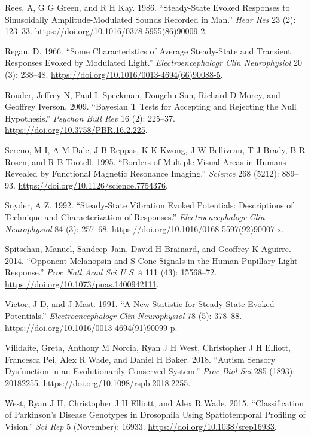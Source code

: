 \documentclass[]{article}
\begin{document}
\leavevmode\hypertarget{ref-Rees1986}{}%
Rees, A, G G Green, and R H Kay. 1986. ``Steady-State Evoked Responses to Sinusoidally Amplitude-Modulated Sounds Recorded in Man.'' \emph{Hear Res} 23 (2): 123--33. \url{https://doi.org/10.1016/0378-5955(86)90009-2}.

\leavevmode\hypertarget{ref-Regan1966}{}%
Regan, D. 1966. ``Some Characteristics of Average Steady-State and Transient Responses Evoked by Modulated Light.'' \emph{Electroencephalogr Clin Neurophysiol} 20 (3): 238--48. \url{https://doi.org/10.1016/0013-4694(66)90088-5}.

\leavevmode\hypertarget{ref-Rouder2009}{}%
Rouder, Jeffrey N, Paul L Speckman, Dongchu Sun, Richard D Morey, and Geoffrey Iverson. 2009. ``Bayesian T Tests for Accepting and Rejecting the Null Hypothesis.'' \emph{Psychon Bull Rev} 16 (2): 225--37. \url{https://doi.org/10.3758/PBR.16.2.225}.

\leavevmode\hypertarget{ref-Sereno1995}{}%
Sereno, M I, A M Dale, J B Reppas, K K Kwong, J W Belliveau, T J Brady, B R Rosen, and R B Tootell. 1995. ``Borders of Multiple Visual Areas in Humans Revealed by Functional Magnetic Resonance Imaging.'' \emph{Science} 268 (5212): 889--93. \url{https://doi.org/10.1126/science.7754376}.

\leavevmode\hypertarget{ref-Snyder1992}{}%
Snyder, A Z. 1992. ``Steady-State Vibration Evoked Potentials: Descriptions of Technique and Characterization of Responses.'' \emph{Electroencephalogr Clin Neurophysiol} 84 (3): 257--68. \url{https://doi.org/10.1016/0168-5597(92)90007-x}.

\leavevmode\hypertarget{ref-Spitschan2014}{}%
Spitschan, Manuel, Sandeep Jain, David H Brainard, and Geoffrey K Aguirre. 2014. ``Opponent Melanopsin and S-Cone Signals in the Human Pupillary Light Response.'' \emph{Proc Natl Acad Sci U S A} 111 (43): 15568--72. \url{https://doi.org/10.1073/pnas.1400942111}.

\leavevmode\hypertarget{ref-Victor1991}{}%
Victor, J D, and J Mast. 1991. ``A New Statistic for Steady-State Evoked Potentials.'' \emph{Electroencephalogr Clin Neurophysiol} 78 (5): 378--88. \url{https://doi.org/10.1016/0013-4694(91)90099-p}.

\leavevmode\hypertarget{ref-Vilidaite2018}{}%
Vilidaite, Greta, Anthony M Norcia, Ryan J H West, Christopher J H Elliott, Francesca Pei, Alex R Wade, and Daniel H Baker. 2018. ``Autism Sensory Dysfunction in an Evolutionarily Conserved System.'' \emph{Proc Biol Sci} 285 (1893): 20182255. \url{https://doi.org/10.1098/rspb.2018.2255}.

\leavevmode\hypertarget{ref-West2015}{}%
West, Ryan J H, Christopher J H Elliott, and Alex R Wade. 2015. ``Classification of Parkinson's Disease Genotypes in Drosophila Using Spatiotemporal Profiling of Vision.'' \emph{Sci Rep} 5 (November): 16933. \url{https://doi.org/10.1038/srep16933}.
\end{document}
